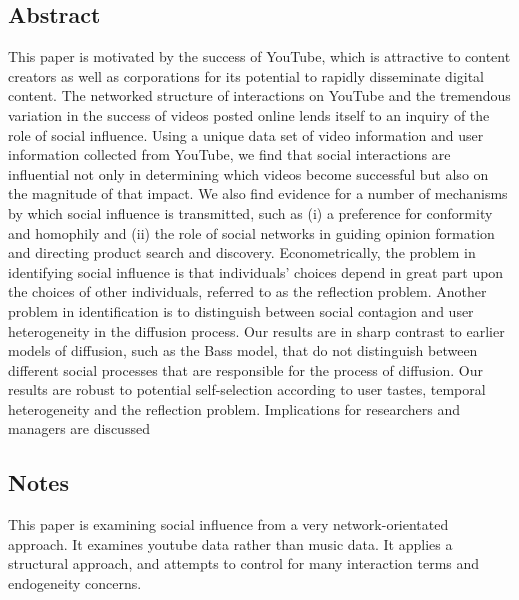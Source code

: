 \documentclass[12pt]{article}
\begin{document}
\subsection{Abstract}
This paper is motivated by the success of YouTube, which is attractive
to content creators as well as corporations for its potential to
rapidly disseminate digital content. The networked structure of
interactions on YouTube and the tremendous variation in the success of
videos posted online lends itself to an inquiry of the role of social
influence. Using a unique data set of video information and user
information collected from YouTube, we find that social interactions
are influential not only in determining which videos become successful
but also on the magnitude of that impact. We also find evidence for a
number of mechanisms by which social influence is transmitted, such as
(i) a preference for conformity and homophily and (ii) the role of
social networks in guiding opinion formation and directing product
search and discovery. Econometrically, the problem in identifying
social influence is that individuals’ choices depend in great part
upon the choices of other individuals, referred to as the reflection
problem. Another problem in identification is to distinguish between
social contagion and user heterogeneity in the diffusion process. Our
results are in sharp contrast to earlier models of diffusion, such as
the Bass model, that do not distinguish between different social
processes that are responsible for the process of diffusion. Our
results are robust to potential self-selection according to user
tastes, temporal heterogeneity and the reflection
problem. Implications for researchers and managers are discussed

\subsection{Notes}

This paper is examining social influence from a very
network-orientated approach. It examines youtube data rather than
music data. It applies a structural approach, and attempts to control
for many interaction terms and endogeneity concerns.
\end{document}
